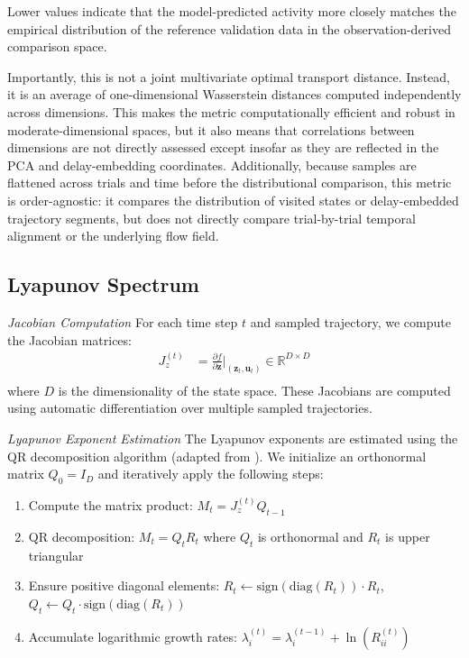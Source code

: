 \documentclass{article}
\begin{document}
Lower values indicate that the model-predicted activity more closely matches the empirical distribution of the reference validation data in the observation-derived comparison space.

Importantly, this is not a joint multivariate optimal transport distance. Instead, it is an average of one-dimensional Wasserstein distances computed independently across dimensions. This makes the metric computationally efficient and robust in moderate-dimensional spaces, but it also means that correlations between dimensions are not directly assessed except insofar as they are reflected in the PCA and delay-embedding coordinates. Additionally, because samples are flattened across trials and time before the distributional comparison, this metric is order-agnostic: it compares the distribution of visited states or delay-embedded trajectory segments, but does not directly compare trial-by-trial temporal alignment or the underlying flow field.

\clearpage
\subsection{Lyapunov Spectrum \label{appendix:ComparisonMethods-Lyapunov}}
\textit{Jacobian Computation}
For each time step $t$ and sampled trajectory, we compute the Jacobian matrices:
\begin{align}
J_z^{(t)} &= \frac{\partial f}{\partial \mathbf{z}}\bigg|_{(\mathbf{z}_t, \mathbf{u}_t)} \in \mathbb{R}^{D \times D} \\
\end{align}
where $D$ is the dimensionality of the state space. These Jacobians are computed using automatic differentiation over multiple sampled trajectories.

\textit{Lyapunov Exponent Estimation}
The Lyapunov exponents are estimated using the QR decomposition algorithm (adapted from \cite{eisen2025characterizingcontrolinteractingsubsystems}). We initialize an orthonormal matrix $Q_0 = I_D$ and iteratively apply the following steps:

\begin{enumerate}
\item Compute the matrix product: $M_t = J_z^{(t)} Q_{t-1}$
\item QR decomposition: $M_t = Q_t R_t$ where $Q_t$ is orthonormal and $R_t$ is upper triangular
\item Ensure positive diagonal elements: $R_t \leftarrow \text{sign}(\text{diag}(R_t)) \cdot R_t$, $Q_t \leftarrow Q_t \cdot \text{sign}(\text{diag}(R_t))$
\item Accumulate logarithmic growth rates: $\lambda_i^{(t)} = \lambda_i^{(t-1)} + \ln(R_{ii}^{(t)})$
\end{enumerate}
\end{document}
